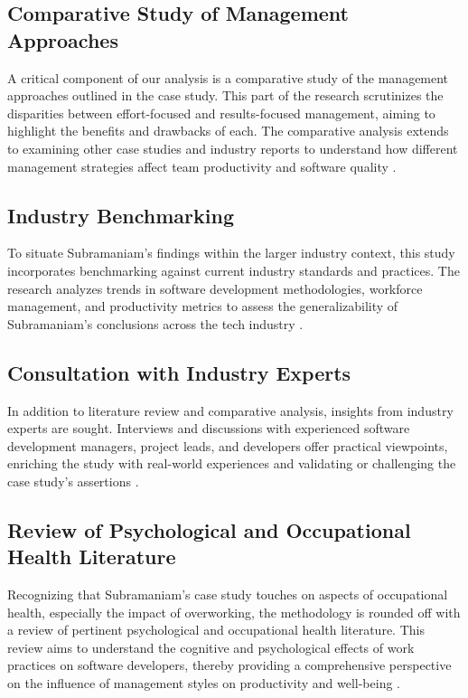 \documentclass{article}
\begin{document}
\subsection{Comparative Study of Management Approaches}
A critical component of our analysis is a comparative study of the management approaches outlined in the case study. This part of the research scrutinizes the disparities between effort-focused and results-focused management, aiming to highlight the benefits and drawbacks of each. The comparative analysis extends to examining other case studies and industry reports to understand how different management strategies affect team productivity and software quality \cite{Verbeeten2015, DelaneySchmidt2019ProductivityFramework}.

\subsection{Industry Benchmarking}
To situate Subramaniam's findings within the larger industry context, this study incorporates benchmarking against current industry standards and practices. The research analyzes trends in software development methodologies, workforce management, and productivity metrics to assess the generalizability of Subramaniam's conclusions across the tech industry \cite{Tawosi2022StoryPointsEffort, Saeed2019SoftwareDevelopment}.

\subsection{Consultation with Industry Experts}
In addition to literature review and comparative analysis, insights from industry experts are sought. Interviews and discussions with experienced software development managers, project leads, and developers offer practical viewpoints, enriching the study with real-world experiences and validating or challenging the case study's assertions \cite{BudacuPocatilu2018}.

\subsection{Review of Psychological and Occupational Health Literature}
Recognizing that Subramaniam's case study touches on aspects of occupational health, especially the impact of overworking, the methodology is rounded off with a review of pertinent psychological and occupational health literature. This review aims to understand the cognitive and psychological effects of work practices on software developers, thereby providing a comprehensive perspective on the influence of management styles on productivity and well-being \cite{Dhas2015WorkLifeBalance, SinghSuarLeiter2012}.
\end{document}
